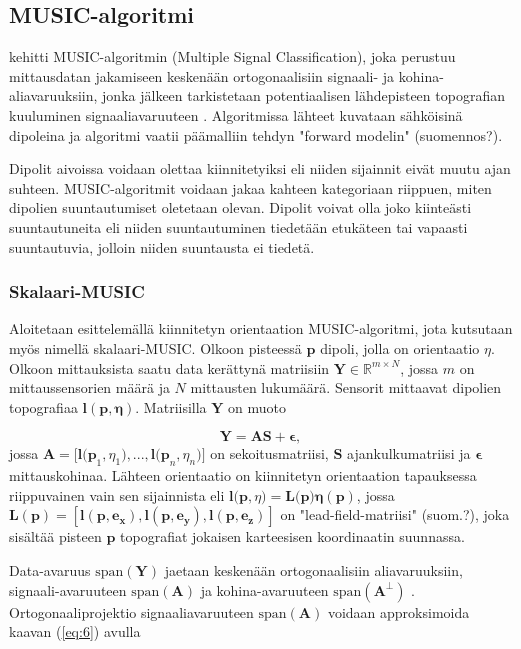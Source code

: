 \subsection{MUSIC-algoritmi}
\cite{Schmidt1986MultipleEstimation} kehitti MUSIC-algoritmin (Multiple Signal Classification), joka perustuu mittausdatan jakamiseen keskenään ortogonaalisiin signaali- ja kohina-aliavaruuksiin, jonka jälkeen tarkistetaan potentiaalisen lähdepisteen topografian kuuluminen signaaliavaruuteen \citep{Mosher1999SourceMUSIC}. Algoritmissa lähteet kuvataan sähköisinä dipoleina ja algoritmi vaatii päämalliin tehdyn "forward modelin" (suomennos?).

Dipolit aivoissa voidaan olettaa kiinnitetyiksi eli niiden sijainnit eivät muutu ajan suhteen. MUSIC-algoritmit voidaan jakaa kahteen kategoriaan riippuen, miten dipolien suuntautumiset oletetaan olevan. Dipolit voivat olla joko kiinteästi suuntautuneita eli niiden suuntautuminen tiedetään etukäteen tai vapaasti suuntautuvia, jolloin niiden suuntausta ei tiedetä. \citep{Makela2018TruncatedLocalization} 

\subsubsection{Skalaari-MUSIC}
Aloitetaan esittelemällä kiinnitetyn orientaation MUSIC-algoritmi, jota kutsutaan myös nimellä skalaari-MUSIC. Olkoon pisteessä $\mathbf{p}$ dipoli, jolla on orientaatio $\eta$. Olkoon mittauksista saatu data kerättynä matriisiin $\mathbf{Y}\in \mathbb{R}^{m\times N}$, jossa $\mathit{m}$ on mittaussensorien määrä ja $\mathit{N}$ mittausten lukumäärä. Sensorit mittaavat dipolien topografiaa $\mathbf{l(p,\eta)}$. Matriisilla $\mathbf{Y}$ on muoto

\begin{equation}
    \mathbf{Y=AS+\epsilon},
\end{equation}
jossa $\mathbf{A =[l(p}_1,\eta_1),...,\mathbf{l(p}_n,\eta_n)]$ on sekoitusmatriisi, $\mathbf{S}$ ajankulkumatriisi ja $\mathbf{\epsilon}$ mittauskohinaa. Lähteen orientaatio on kiinnitetyn orientaation tapauksessa riippuvainen vain sen sijainnista eli $\mathbf{l(p},\eta)=\mathbf{L(p})\mathbf{\eta}(\mathbf{p})$, jossa $\mathbf{L(p) = [l(p,e_x),l(p,e_y),l(p,e_z)]}$ on "lead-field-matriisi" (suom.?), joka sisältää pisteen $\mathbf{p}$ topografiat jokaisen karteesisen koordinaatin suunnassa. 

Data-avaruus $\text{span}(\mathbf{Y})$ jaetaan keskenään ortogonaalisiin aliavaruuksiin, signaali-avaruuteen $\text{span}(\mathbf{A})$  ja kohina-avaruuteen $\text{span}(\mathbf{A^\bot})$  \citep{Mosher1999SourceMUSIC}. Ortogonaaliprojektio signaaliavaruuteen $\text{span}(\mathbf{A})$ voidaan approksimoida kaavan (\ref{eq:6}) avulla

